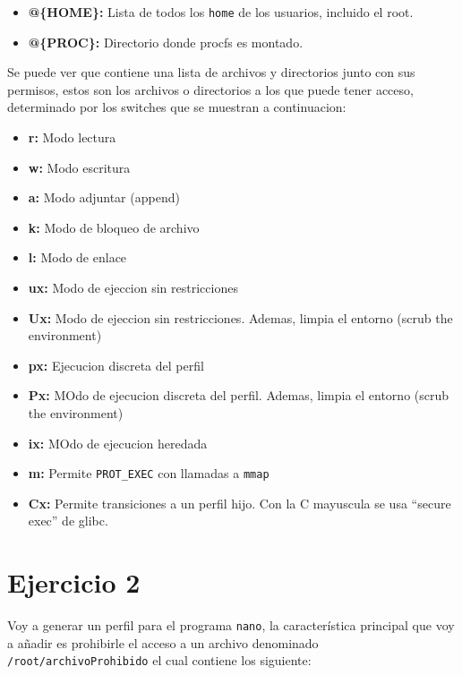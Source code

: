 \documentclass{article}
\begin{document}

\begin{itemize}
    \item \textbf{@\{HOME\}: }Lista de todos los \verb|home| de los usuarios, incluido el root.
    \item \textbf{@\{PROC\}: }Directorio donde procfs es montado.
\end{itemize}

Se puede ver que contiene una lista de archivos y directorios junto con sus permisos, estos son los archivos o directorios a los que puede tener acceso, determinado por los switches que se muestran a continuacion:

\begin{itemize}
    \item \textbf{r: }Modo lectura
    \item \textbf{w: }Modo escritura
    \item \textbf{a: }Modo adjuntar (append)
    \item \textbf{k: }Modo de bloqueo de archivo
    \item \textbf{l: }Modo de enlace
    \item \textbf{ux: }Modo de ejeccion sin restricciones
    \item \textbf{Ux: }Modo de ejeccion sin restricciones. Ademas, limpia el entorno (scrub the environment)
    \item \textbf{px: }Ejecucion discreta del perfil
    \item \textbf{Px: }MOdo de ejecucion discreta del perfil. Ademas, limpia el entorno (scrub the environment)
    \item \textbf{ix: }MOdo de ejecucion heredada
    \item \textbf{m: }Permite \verb|PROT_EXEC| con llamadas a \verb|mmap|
    \item \textbf{Cx: }Permite transiciones a un perfil hijo. Con la C mayuscula se usa ``secure exec'' de glibc.
\end{itemize}


\section*{Ejercicio 2}
Voy a generar un perfil para el programa \verb|nano|, la característica principal que voy a añadir es prohibirle el acceso a un archivo denominado \verb|/root/archivoProhibido| el cual contiene los siguiente:

\end{document}
